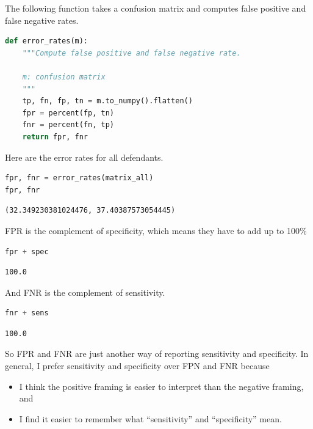 The following function takes a confusion matrix and computes false
positive and false negative rates.

\begin{lstlisting}[language=Python,style=source]
def error_rates(m):
    """Compute false positive and false negative rate.

    m: confusion matrix
    """
    tp, fn, fp, tn = m.to_numpy().flatten()
    fpr = percent(fp, tn)
    fnr = percent(fn, tp)
    return fpr, fnr
\end{lstlisting}

Here are the error rates for all defendants.

\begin{lstlisting}[language=Python,style=source]
fpr, fnr = error_rates(matrix_all)
fpr, fnr
\end{lstlisting}

\begin{lstlisting}[style=output]
(32.349230381024476, 37.40387573054445)
\end{lstlisting}

FPR is the complement of specificity, which means they have to add up to
100\%

\begin{lstlisting}[language=Python,style=source]
fpr + spec
\end{lstlisting}

\begin{lstlisting}[style=output]
100.0
\end{lstlisting}

And FNR is the complement of sensitivity.

\begin{lstlisting}[language=Python,style=source]
fnr + sens
\end{lstlisting}

\begin{lstlisting}[style=output]
100.0
\end{lstlisting}

So FPR and FNR are just another way of reporting sensitivity and
specificity. In general, I prefer sensitivity and specificity over FPN
and FNR because

\begin{itemize}
\item
  I think the positive framing is easier to interpret than the negative
  framing, and
\item
  I find it easier to remember what ``sensitivity'' and ``specificity''
  mean.
\end{itemize}

